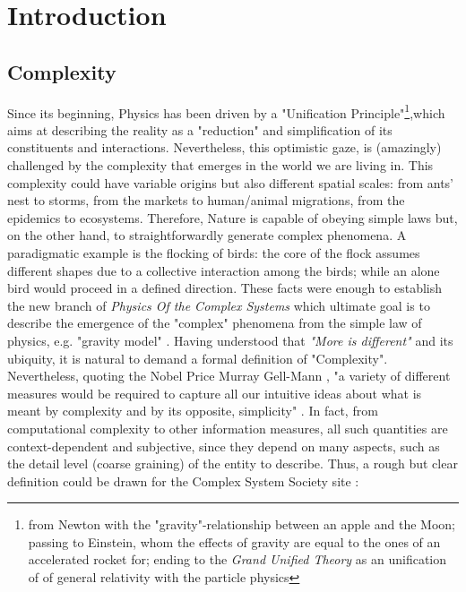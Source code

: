 \documentclass[a4paper,10pt, oneside]{book} %
\theoremstyle{definition}
\begin{document}
\mainmatter
\newcommand{\changefont}{%
    \fontsize{12}{12}
}
\pagestyle{fancy}
\fancyhf{}
\lhead{\changefont \slshape \nouppercase{\rightmark}} %
\rhead{\changefont \slshape \nouppercase{\leftmark}} %
\cfoot{\thepage}

\chapter[Introduction]{Introduction}
%

\section{Complexity}
Since its beginning, Physics has been driven by a "Unification Principle"\footnote{from Newton with the "gravity"-relationship between an apple and the Moon; passing to Einstein, whom the effects of gravity are equal to the ones of an accelerated rocket for; ending to the \textit{Grand Unified Theory} as an unification of of general relativity with the particle physics},which aims at describing the reality as a "reduction" and simplification of its constituents and interactions. Nevertheless, this optimistic gaze, is (amazingly) challenged by the complexity that emerges in the world we are living in. This complexity could have variable origins but also different spatial scales: from ants' nest to storms, from the markets to human/animal migrations, from the epidemics to ecosystems. Therefore, Nature is capable of obeying simple laws but, on the other hand, to straightforwardly generate complex phenomena. A paradigmatic example is the flocking of birds: the core of the flock assumes different shapes due to a collective interaction among the birds; while an alone bird would proceed in a defined direction.
These facts were enough to establish the new branch of \textit{Physics Of the Complex Systems} which ultimate goal is to describe the emergence of the "complex" phenomena from the simple law of physics, e.g. "gravity model" \cite{GravityModelsandEmpiricalTrade}.
Having understood that \textit{"More is different"} \cite{Anderson:1972_MoreIsDifferent} and its ubiquity, it is natural to demand a formal definition of "Complexity". Nevertheless, quoting the Nobel Price Murray Gell-Mann \cite{Gell-Man:1987_S&C}, "a variety of different measures would be required to capture all our intuitive ideas about what is meant by complexity and by its opposite, simplicity" . In fact, from computational complexity to other information measures, all such quantities are context-dependent and subjective, since they depend on many aspects, such as the detail level (coarse graining) of the entity to describe. Thus, a rough but clear definition could be drawn for the Complex System Society site \cite{CSS:2021_compsystdef}:
\end{document}
